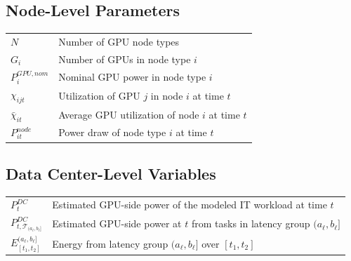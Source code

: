 \documentclass[preprint,12pt]{elsarticle}
\begin{document}
\subsection*{Node-Level Parameters}
\begin{tabular}{ll}
$N$ & Number of GPU node types \\
$G_i$ & Number of GPUs in node type $i$ \\
$P^{GPU,nom}_i$ & Nominal GPU power in node type $i$ \\
$\chi_{ijt}$ & Utilization of GPU $j$ in node $i$ at time $t$ \\
$\bar{\chi}_{it}$ & Average GPU utilization of node $i$ at time $t$ \\
$P^{node}_{it}$ & Power draw of node type $i$ at time $t$ \\
\end{tabular}

\vspace{1em}

\subsection*{Data Center-Level Variables}
\begin{tabular}{ll}
$P^{DC}_t$ & Estimated GPU-side power of the modeled IT workload at time $t$ \\
$P^{DC}_{t, \mathcal{T}_{(a_\ell, b_\ell]}}$ & Estimated GPU-side power at $t$ from tasks in latency group $(a_\ell, b_\ell]$ \\
$E^{(a_\ell, b_\ell]}_{[t_1, t_2]}$ & Energy from latency group $(a_\ell, b_\ell]$ over $[t_1, t_2]$ \\
\end{tabular}

\vspace{1em}
\end{document}
